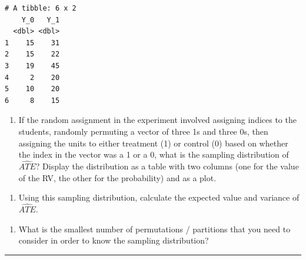 \documentclass[
  letterpaper,
  DIV=11,
  numbers=noendperiod]{scrartcl}
\providecommand{\tightlist}{%
  \setlength{\itemsep}{0pt}\setlength{\parskip}{0pt}}
\begin{document}
\begin{verbatim}
# A tibble: 6 x 2
    Y_0   Y_1
  <dbl> <dbl>
1    15    31
2    15    22
3    19    45
4     2    20
5    10    20
6     8    15
\end{verbatim}

\begin{enumerate}
\def\labelenumi{\arabic{enumi}.}
\setcounter{enumi}{3}
\tightlist
\item
  If the random assignment in the experiment involved assigning indices
  to the students, randomly permuting a vector of three 1s and three 0s,
  then assigning the units to either treatment (1) or control (0) based
  on whether the index in the vector was a 1 or a 0, what is the
  sampling distribution of \(\widehat{ATE}\)? Display the distribution
  as a table with two columns (one for the value of the RV, the other
  for the probability) and as a plot.
\end{enumerate}

\begin{enumerate}
\def\labelenumi{\arabic{enumi}.}
\setcounter{enumi}{4}
\tightlist
\item
  Using this sampling distribution, calculate the expected value and
  variance of \(\widehat{ATE}\).
\end{enumerate}

\begin{enumerate}
\def\labelenumi{\arabic{enumi}.}
\setcounter{enumi}{5}
\tightlist
\item
  What is the smallest number of permutations / partitions that you need
  to consider in order to know the sampling distribution?
\end{enumerate}

\begin{center}\rule{0.5\linewidth}{0.5pt}\end{center}

\newpage{}
\end{document}
